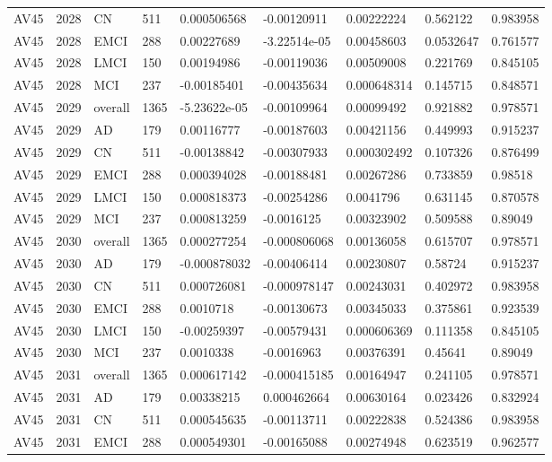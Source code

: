 \begin{landscape}
\begin{longtable}{lllllllll}
AV45 & 2028 & CN & 511 & 0.000506568 & -0.00120911 & 0.00222224 & 0.562122 & 0.983958 \\
AV45 & 2028 & EMCI & 288 & 0.00227689 & -3.22514e-05 & 0.00458603 & 0.0532647 & 0.761577 \\
AV45 & 2028 & LMCI & 150 & 0.00194986 & -0.00119036 & 0.00509008 & 0.221769 & 0.845105 \\
AV45 & 2028 & MCI & 237 & -0.00185401 & -0.00435634 & 0.000648314 & 0.145715 & 0.848571 \\
AV45 & 2029 & overall & 1365 & -5.23622e-05 & -0.00109964 & 0.00099492 & 0.921882 & 0.978571 \\
AV45 & 2029 & AD & 179 & 0.00116777 & -0.00187603 & 0.00421156 & 0.449993 & 0.915237 \\
AV45 & 2029 & CN & 511 & -0.00138842 & -0.00307933 & 0.000302492 & 0.107326 & 0.876499 \\
AV45 & 2029 & EMCI & 288 & 0.000394028 & -0.00188481 & 0.00267286 & 0.733859 & 0.98518 \\
AV45 & 2029 & LMCI & 150 & 0.000818373 & -0.00254286 & 0.0041796 & 0.631145 & 0.870578 \\
AV45 & 2029 & MCI & 237 & 0.000813259 & -0.0016125 & 0.00323902 & 0.509588 & 0.89049 \\
AV45 & 2030 & overall & 1365 & 0.000277254 & -0.000806068 & 0.00136058 & 0.615707 & 0.978571 \\
AV45 & 2030 & AD & 179 & -0.000878032 & -0.00406414 & 0.00230807 & 0.58724 & 0.915237 \\
AV45 & 2030 & CN & 511 & 0.000726081 & -0.000978147 & 0.00243031 & 0.402972 & 0.983958 \\
AV45 & 2030 & EMCI & 288 & 0.0010718 & -0.00130673 & 0.00345033 & 0.375861 & 0.923539 \\
AV45 & 2030 & LMCI & 150 & -0.00259397 & -0.00579431 & 0.000606369 & 0.111358 & 0.845105 \\
AV45 & 2030 & MCI & 237 & 0.0010338 & -0.0016963 & 0.00376391 & 0.45641 & 0.89049 \\
AV45 & 2031 & overall & 1365 & 0.000617142 & -0.000415185 & 0.00164947 & 0.241105 & 0.978571 \\
AV45 & 2031 & AD & 179 & 0.00338215 & 0.000462664 & 0.00630164 & 0.023426 & 0.832924 \\
AV45 & 2031 & CN & 511 & 0.000545635 & -0.00113711 & 0.00222838 & 0.524386 & 0.983958 \\
AV45 & 2031 & EMCI & 288 & 0.000549301 & -0.00165088 & 0.00274948 & 0.623519 & 0.962577 \\

\end{longtable}
\end{landscape}
